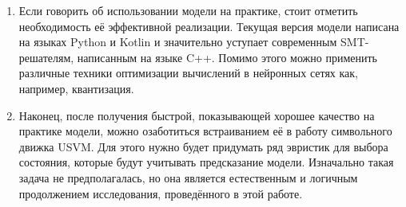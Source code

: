 \begin{enumerate}
    \item Если говорить об использовании модели на практике, стоит отметить необходимость её эффективной реализации. Текущая версия модели написана на языках Python и Kotlin и значительно уступает современным SMT-решателям, написанным на языке C++. Помимо этого можно применить различные техники оптимизации вычислений в нейронных сетях как, например, квантизация.
    \item Наконец, после получения быстрой, показывающей хорошее качество на практике модели, можно озаботиться встраиванием её в работу символьного движка USVM. Для этого нужно будет придумать ряд эвристик для выбора состояния, которые будут учитывать предсказание модели. Изначально такая задача не предполагалась, но она является естественным и логичным продолжением исследования, проведённого в этой работе.
\end{enumerate}


